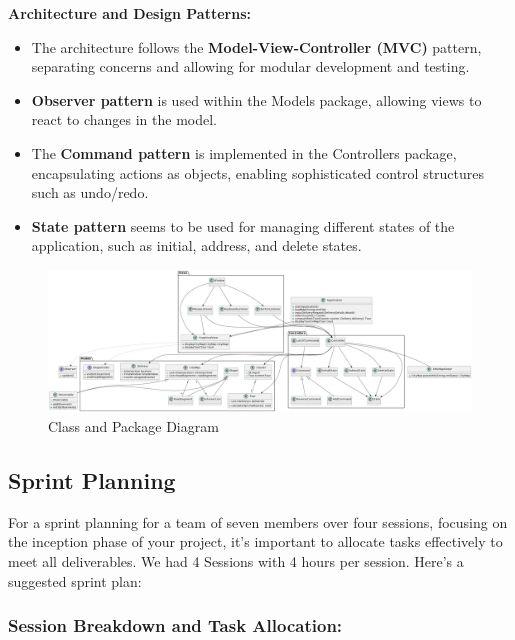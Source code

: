 \documentclass{article}
\begin{document}
\textbf{Architecture and Design Patterns:}
\begin{itemize}
    \item The architecture follows the \textbf{Model-View-Controller (MVC)} pattern, separating concerns and allowing for modular development and testing.
    \item \textbf{Observer pattern} is used within the Models package, allowing views to react to changes in the model.
    \item The \textbf{Command pattern} is implemented in the Controllers package, encapsulating actions as objects, enabling sophisticated control structures such as undo/redo.
    \item \textbf{State pattern} seems to be used for managing different states of the application, such as initial, address, and delete states.
\end{itemize}

\begin{landscape}
\begin{figure}[]
\centering
\includegraphics[width=\linewidth, height=\textheight, keepaspectratio]{architecture_diag.png}
\caption{Class and Package Diagram}
\end{figure}
\end{landscape}

\subsection{Sprint Planning}
For a sprint planning for a team of seven members over four sessions, focusing on the inception phase of your project, it's important to allocate tasks effectively to meet all deliverables. We had 4 Sessions with 4 hours per session. Here's a suggested sprint plan:

\subsubsection*{Session Breakdown and Task Allocation:}
\end{document}
